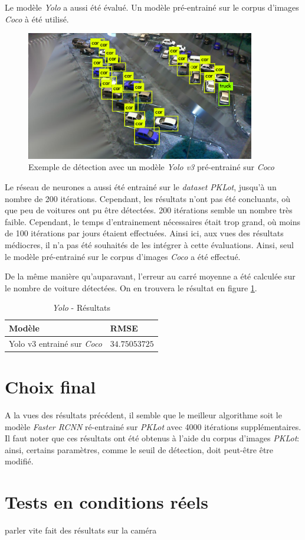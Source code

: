 Le modèle \textit{Yolo} a aussi été évalué. Un modèle pré-entrainé sur le corpus d'images \textit{Coco}\autocite{data:coco} à été utilisé.

\begin{figure}[ht]
    \includegraphics[width=10cm]{img/tests/yolo_bb.png}
    \centering
    \caption{Exemple de détection avec un modèle \textit{Yolo v3} pré-entrainé sur \textit{Coco}}
    \label{fig:yolo_bb}
\end{figure} 

Le réseau de neurones a aussi été entrainé sur le \textit{dataset} \textit{PKLot}, jusqu'à un nombre de 200 itérations. Cependant, les résultats n'ont pas été concluants, où que peu de voitures ont pu être détectées. 200 itérations semble un nombre très faible. Cependant, le temps d'entrainement nécessaires était trop grand, où moins de 100 itérations par jours étaient effectuées. Ainsi ici, aux vues des résultats médiocres, il n'a pas été souhaités de les intégrer à cette évaluations. Ainsi, seul le modèle pré-entrainé sur le corpus d'images \textit{Coco} a été effectué. 

De la même manière qu'auparavant, l'erreur au carré moyenne a été calculée sur le nombre de voiture détectées. On en trouvera le résultat en figure \ref{tab:yolo_results}.

\begin{table}[ht]
\centering
\begin{tabular}{@{}ll@{}}
\toprule
Modèle & RMSE \\ \midrule
Yolo v3 entrainé sur \textit{Coco}  & $34.75053725$ \\ \bottomrule
\end{tabular}
\caption{\textit{Yolo} - Résultats}
\label{tab:yolo_results}
\end{table}

\section{Choix final}

A la vues des résultats précédent, il semble que le meilleur algorithme soit le modèle \textit{Faster RCNN} ré-entrainé sur \textit{PKLot} avec 4000 itérations supplémentaires. Il faut noter que ces résultats ont été obtenus à l'aide du corpus d'images \textit{PKLot}: ainsi, certains paramètres, comme le seuil de détection, doit peut-être être modifié. 


\section{Tests en conditions réels}
parler vite fait des résultats sur la caméra